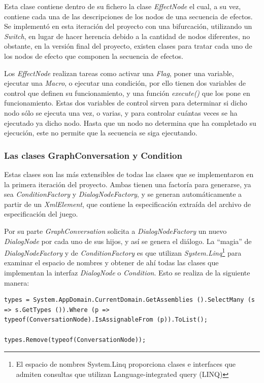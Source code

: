 Esta clase contiene dentro de su fichero la clase \textit{EffectNode} el cual, a su vez, contiene cada una de las descripciones de los nodos de una secuencia de efectos. Se implementó en esta iteración del proyecto con una bifurcación, utilizando un \textit{Switch}, en lugar de hacer herencia debido a la cantidad de nodos diferentes, no obstante, en la versión final del proyecto, existen clases para tratar cada uno de los nodos de efecto que componen la secuencia de efectos.

Los \textit{EffectNode} realizan tareas como activar una \textit{Flag}, poner una variable, ejecutar una \textit{Macro}, o ejecutar una condición, por ello tienen dos variables de control que definen su funcionamiento, y una función \textit{execute()} que los pone en funcionamiento. Estas dos variables de control sirven para determinar si dicho nodo sólo se ejecuta una vez, o varias, y para controlar cuántas veces se ha ejecutado ya dicho nodo. Hasta que un nodo no determina que ha completado su ejecución, este no permite que la secuencia se siga ejecutando.

\subsubsection{Las clases GraphConversation y Condition}
\label{linqit1}

Estas clases son las más extensibles de todas las clases que se implementaron en la primera iteración del proyecto. Ambas tienen una factoría para generarse, ya sea \textit{ConditionFactory} y \textit{DialogNodeFactory}, y se generan automáticamente a partir de un \textit{XmlElement}, que contiene la especificación extraída del archivo de especificación del juego.

Por su parte \textit{GraphConversation} solicita a \textit{DialogNodeFactory} un nuevo \textit{DialogNode} por cada uno de sus hijos, y así se genera el diálogo. La “magia” de \textit{DialogNodeFactory} y de \textit{ConditionFactory} es que utilizan \textit{System.Linq}\footnote{El espacio de nombres System.Linq proporciona clases e interfaces que admiten consultas que utilizan Language-integrated query (LINQ)} para examinar el espacio de nombres y obtener de ahí todas las clases que implementan la interfaz \textit{DialogNode} o \textit{Condition}. Esto se realiza de la siguiente manera:
\begin{lstlisting}
types = System.AppDomain.CurrentDomain.GetAssemblies ().SelectMany (s => s.GetTypes ()).Where (p => typeof(ConversationNode).IsAssignableFrom (p)).ToList();

types.Remove(typeof(ConversationNode));
\end{lstlisting}

